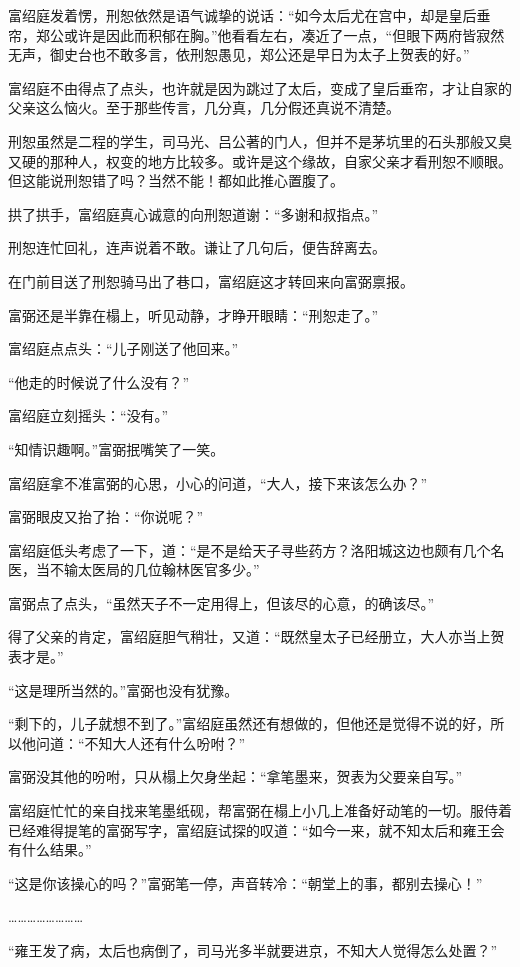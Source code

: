 富绍庭发着愣，刑恕依然是语气诚挚的说话：“如今太后尤在宫中，却是皇后垂帘，郑公或许是因此而积郁在胸。”他看看左右，凑近了一点，“但眼下两府皆寂然无声，御史台也不敢多言，依刑恕愚见，郑公还是早日为太子上贺表的好。”

富绍庭不由得点了点头，也许就是因为跳过了太后，变成了皇后垂帘，才让自家的父亲这么恼火。至于那些传言，几分真，几分假还真说不清楚。

刑恕虽然是二程的学生，司马光、吕公著的门人，但并不是茅坑里的石头那般又臭又硬的那种人，权变的地方比较多。或许是这个缘故，自家父亲才看刑恕不顺眼。但这能说刑恕错了吗？当然不能！都如此推心置腹了。

拱了拱手，富绍庭真心诚意的向刑恕道谢：“多谢和叔指点。”

刑恕连忙回礼，连声说着不敢。谦让了几句后，便告辞离去。

在门前目送了刑恕骑马出了巷口，富绍庭这才转回来向富弼禀报。

富弼还是半靠在榻上，听见动静，才睁开眼睛：“刑恕走了。”

富绍庭点点头：“儿子刚送了他回来。”

“他走的时候说了什么没有？”

富绍庭立刻摇头：“没有。”

“知情识趣啊。”富弼抿嘴笑了一笑。

富绍庭拿不准富弼的心思，小心的问道，“大人，接下来该怎么办？”

富弼眼皮又抬了抬：“你说呢？”

富绍庭低头考虑了一下，道：“是不是给天子寻些药方？洛阳城这边也颇有几个名医，当不输太医局的几位翰林医官多少。”

富弼点了点头，“虽然天子不一定用得上，但该尽的心意，的确该尽。”

得了父亲的肯定，富绍庭胆气稍壮，又道：“既然皇太子已经册立，大人亦当上贺表才是。”

“这是理所当然的。”富弼也没有犹豫。

“剩下的，儿子就想不到了。”富绍庭虽然还有想做的，但他还是觉得不说的好，所以他问道：“不知大人还有什么吩咐？”

富弼没其他的吩咐，只从榻上欠身坐起：“拿笔墨来，贺表为父要亲自写。”

富绍庭忙忙的亲自找来笔墨纸砚，帮富弼在榻上小几上准备好动笔的一切。服侍着已经难得提笔的富弼写字，富绍庭试探的叹道：“如今一来，就不知太后和雍王会有什么结果。”

“这是你该操心的吗？”富弼笔一停，声音转冷：“朝堂上的事，都别去操心！”

……………………

“雍王发了病，太后也病倒了，司马光多半就要进京，不知大人觉得怎么处置？”

